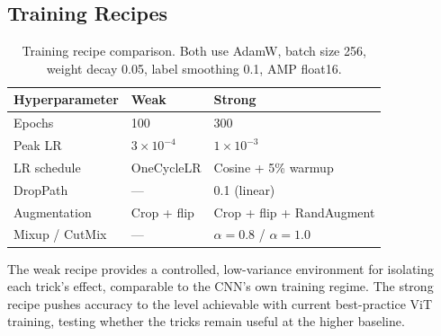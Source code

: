 \subsection{Training Recipes}

\begin{table}[h]
    \centering
    \setlength{\tabcolsep}{3pt}
    \small
    \begin{tabular}{lll}
        \toprule
        Hyperparameter & Weak             & Strong                          \\
        \midrule
        Epochs         & 100              & 300                             \\
        Peak LR        & $3\times10^{-4}$ & $1\times10^{-3}$                \\
        LR schedule    & OneCycleLR       & Cosine + 5\% warmup             \\
        DropPath       & ---              & 0.1 (linear)                    \\
        Augmentation   & Crop + flip      & Crop + flip + RandAugment       \\
        Mixup / CutMix & ---              & $\alpha{=}0.8$ / $\alpha{=}1.0$ \\
        \bottomrule
    \end{tabular}
    \caption{Training recipe comparison. Both use AdamW, batch size 256, weight decay 0.05, label smoothing 0.1, AMP float16.}\label{tab:recipes}
\end{table}

The weak recipe provides a controlled, low-variance environment for isolating each trick's effect, comparable to the CNN's own training regime.
The strong recipe pushes accuracy to the level achievable with current best-practice ViT training, testing whether the tricks remain useful at the higher baseline.

